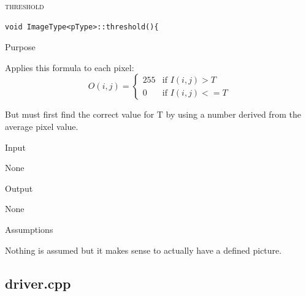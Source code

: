 \documentclass[pdftex, 11pt]{article}
\begin{document}
\begin{description}
\begin{description}
		\end{description}

	\item{\textsc{threshold}}
		\begin{description}

\begin{lstlisting}
void ImageType<pType>::threshold(){
\end{lstlisting}

			\item{Purpose}

				Applies this formula to each pixel:
				{\small
				\[
				O(i,j) = 
				\begin{cases} 
					255 & \text{if } I(i,j) > T \\
					0   & \text{if } I(i,j) <= T
				\end{cases}
				\]}

				But must first find the correct value for T by
				using a number derived from the average pixel
				value.


			\item{Input}

				None

			\item{Output}

				None

			\item{Assumptions}

				Nothing is assumed but it makes sense to
				actually have a defined picture.

		\end{description}


\end{description}

\subsection{driver.cpp}
\end{document}
